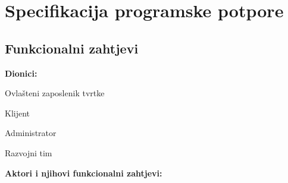 \chapter{Specifikacija programske potpore}

\section{Funkcionalni zahtjevi}			

\noindent \textbf{Dionici:}

\begin{packed_enum}
	
	\item Ovlašteni zaposlenik tvrtke
	\item Klijent
	\item Administrator
	\item Razvojni tim
	
\end{packed_enum}

\noindent \textbf{Aktori i njihovi funkcionalni zahtjevi:}


